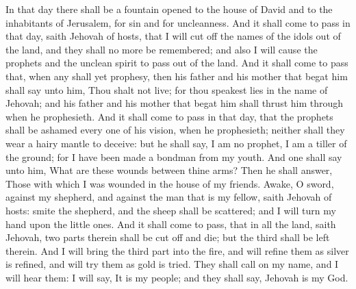In that day there shall be a fountain opened to the house of David and to the inhabitants of Jerusalem, for sin and for uncleanness. And it shall come to pass in that day, saith Jehovah of hosts, that I will cut off the names of the idols out of the land, and they shall no more be remembered; and also I will cause the prophets and the unclean spirit to pass out of the land. And it shall come to pass that, when any shall yet prophesy, then his father and his mother that begat him shall say unto him, Thou shalt not live; for thou speakest lies in the name of Jehovah; and his father and his mother that begat him shall thrust him through when he prophesieth. And it shall come to pass in that day, that the prophets shall be ashamed every one of his vision, when he prophesieth; neither shall they wear a hairy mantle to deceive: but he shall say, I am no prophet, I am a tiller of the ground; for I have been made a bondman from my youth. And one shall say unto him, What are these wounds between thine arms? Then he shall answer, Those with which I was wounded in the house of my friends.  Awake, O sword, against my shepherd, and against the man that is my fellow, saith Jehovah of hosts: smite the shepherd, and the sheep shall be scattered; and I will turn my hand upon the little ones. And it shall come to pass, that in all the land, saith Jehovah, two parts therein shall be cut off and die; but the third shall be left therein. And I will bring the third part into the fire, and will refine them as silver is refined, and will try them as gold is tried. They shall call on my name, and I will hear them: I will say, It is my people; and they shall say, Jehovah is my God. 

